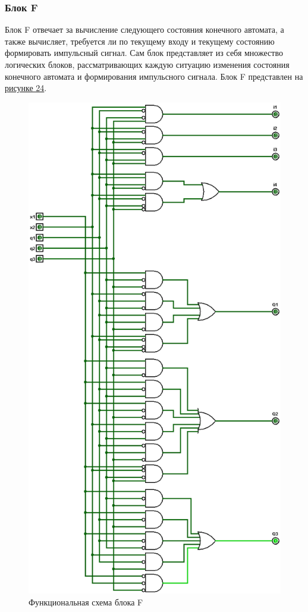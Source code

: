 \documentclass[11pt,a4paper,final]{article} %
\begin{document}
\subsubsection{Блок F}

Блок F отвечает за вычисление следующего состояния конечного автомата, а также вычисляет, требуется ли по текущему входу и текущему состоянию формировать импульсный сигнал. Сам блок представляет из себя множество логических блоков, рассматривающих каждую ситуацию изменения состояния конечного автомата и формирования импульсного сигнала. Блок F представлен на \hyperref[fig:F]{рисунке 24}.

\begin{figure}[H]
	\centering
	\includegraphics[width=0.75 \linewidth]{img/F.png}
	\caption{Функциональная схема блока F}
	\label{fig:F}
\end{figure}
\end{document}
